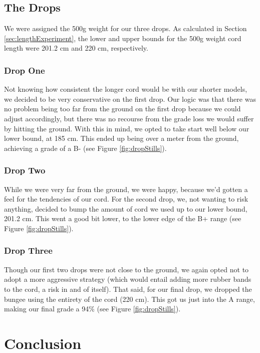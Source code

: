 \documentclass[12pt]{article}
\begin{document}
\subsection{The Drops}

We were assigned the 500g weight for our three drops. As calculated in Section \ref{sec:lengthExperiment}, the lower and upper bounds for the 500g weight cord length were 201.2 cm and 220 cm, respectively. 

\subsubsection{Drop One}
Not knowing how consistent the longer cord would be with our shorter models, we decided to be very conservative on the first drop. Our logic was that there was no problem being too far from the ground on the first drop because we could adjust accordingly, but there was no recourse from the grade loss we would suffer by hitting the ground. With this in mind, we opted to take start well below our lower bound, at 185 cm. This ended up being over a meter from the ground, achieving a grade of a B- (see Figure \ref{fig:dropStills}).

\subsubsection{Drop Two}
While we were very far from the ground, we were happy, because we'd gotten a feel for the tendencies of our cord. For the second drop, we, not wanting to risk anything, decided to bump the amount of cord we used up to our lower bound, 201.2 cm. This went a good bit lower, to the lower edge of the B+ range (see Figure \ref{fig:dropStills}).

\subsubsection{Drop Three}
Though our first two drops were not close to the ground, we again opted not to adopt a more aggressive strategy (which would entail adding more rubber bands to the cord, a risk in and of itself). That said, for our final drop, we dropped the bungee using the entirety of the cord (220 cm). This got us just into the A range, making our final grade a 94\% (see Figure \ref{fig:dropStills}).

\section{Conclusion}
\end{document}

